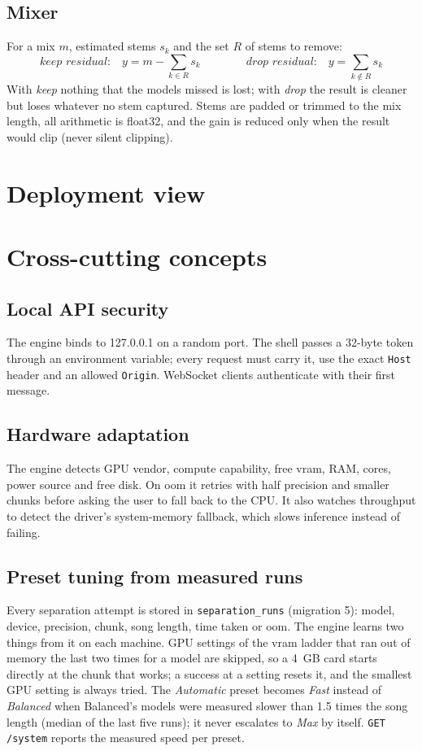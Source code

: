 \documentclass{covermaker}
\begin{document}
\section{Mixer}
For a mix $m$, estimated stems $s_k$ and the set $R$ of stems to remove:
\[
\textit{keep residual:}\quad y = m - \sum_{k \in R} s_k
\qquad\qquad
\textit{drop residual:}\quad y = \sum_{k \notin R} s_k
\]
With \emph{keep} nothing that the models missed is lost; with \emph{drop} the
result is cleaner but loses whatever no stem captured. Stems are padded or
trimmed to the mix length, all arithmetic is float32, and the gain is reduced
only when the result would clip (never silent clipping).

\chapter{Deployment view}


\chapter{Cross-cutting concepts}
\section{Local API security}
The engine binds to 127.0.0.1 on a random port. The shell passes a 32-byte token
through an environment variable; every request must carry it, use the exact
\texttt{Host} header and an allowed \texttt{Origin}. WebSocket clients
authenticate with their first message.

\section{Hardware adaptation}
The engine detects GPU vendor, compute capability, free \gls{vram}, RAM, cores,
power source and free disk. On \gls{oom} it retries with half precision and
smaller chunks before asking the user to fall back to the CPU. It also watches
throughput to detect the driver's system-memory fallback, which slows inference
instead of failing.

\section{Preset tuning from measured runs}
Every separation attempt is stored in \texttt{separation\_runs} (migration 5):
model, device, precision, chunk, song length, time taken or \gls{oom}. The
engine learns two things from it on each machine. GPU settings of the
\gls{vram} ladder that ran out of memory the last two times for a model are
skipped, so a 4~GB card starts directly at the chunk that works; a success at a
setting resets it, and the smallest GPU setting is always tried. The
\emph{Automatic} preset becomes \emph{Fast} instead of \emph{Balanced} when
Balanced's models were measured slower than 1.5 times the song length (median of
the last five runs); it never escalates to \emph{Max} by itself.
\texttt{GET /system} reports the measured speed per preset.
\end{document}
